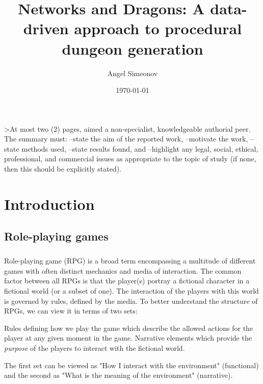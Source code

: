 \documentclass{UoYCSproject}
\author{Angel Simeonov}
\title{Networks and Dragons: A data-driven approach to procedural dungeon generation}
\date{\today}
\begin{document}
\maketitle
\listoffigures
\listoftables

\begin{summary}
>At most two (2) pages, aimed a non-specialist, knowledgeable authorial peer.
The summary must:
--state the aim of the reported work,
--motivate the work,
--state methods used,
--state results found, and
--highlight any legal, social, ethical, professional, and commercial issues as appropriate to the topic of study (if none, then this should be explicitly stated).
\end{summary}

\chapter{Introduction}
\label{cha:Introduction}

\section{Role-playing games}

\paragraph{}
Role-playing game (RPG) is a broad term encompassing a multitude of different games with often distinct mechanics and media of interaction. The common factor between all RPGs is that the player(s) portray a fictional character in a fictional world (or a subset of one). The interaction of the players with this world is governed by rules, defined by the media. To better understand the structure of RPGs, we can view it in terms of two sets: 
\begin{outline}[enumerate]
  \1 Rules defining how we play the game which describe the allowed actions for the player at any given moment in the game.
  \1 Narrative elements which provide the \textit{purpose} of the players to interact with the fictional world. 
\end{outline}
The first set can be viewed as "How I interact with the environment" (functional) and the second as "What is the meaning of the environment" (narrative).
\end{document}
